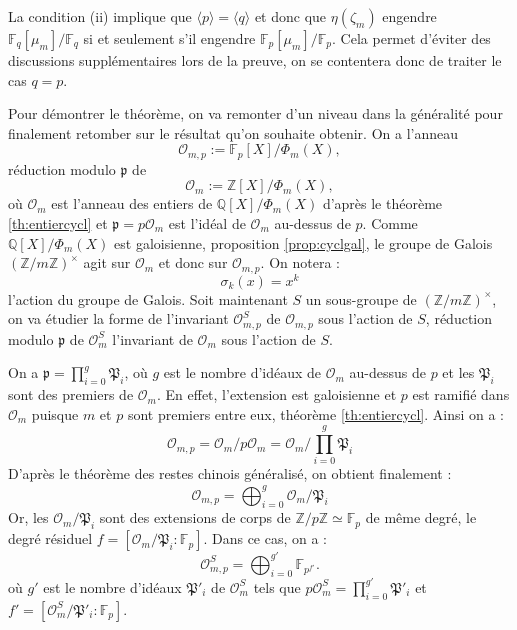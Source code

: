 \documentclass[a4paper]{article} %
\numberwithin{section}{part}
\numberwithin{equation}{section}
\newcommand\zmodninv[1]{(\mathbb{Z}/#1\mathbb{Z})^{\times}}
\newcommand\GF[1]{\mathbb{F}_{#1}}
\newcommand\QQ{\mathbb{Q}}
\newcommand\ZZ{\mathbb{Z}}
\newcommand\EO{\mathcal{O}}
\newcommand\groupgen[1]{\langle{#1}\rangle}
\begin{document}
La condition (ii) implique que $\groupgen{p} = \groupgen{q}$ et donc que
$\eta(\zeta_m)$ engendre $\GF{q}[\mu_m]/\GF{q}$ si et seulement s'il engendre
$\GF{p}[\mu_m]/\GF{p}$. Cela permet d'éviter des discussions supplémentaires 
lors de la preuve, on se contentera donc de traiter le cas $q = p$.\par
Pour démontrer le théorème, on va remonter d'un niveau dans la généralité pour
finalement retomber sur le résultat qu'on souhaite obtenir. On a l'anneau 
\begin{equation}
\EO_{m,p} := \GF{p}[X]/\Phi_m(X),
\end{equation}
réduction modulo $\mathfrak{p}$ de 
\begin{equation}
\EO_m := \ZZ[X]/\Phi_m(X),
\end{equation}
où $\EO_m$ est l'anneau des entiers de $\QQ[X]/\Phi_m(X)$ d'après le théorème 
\ref{th:entiercycl} et $\mathfrak{p} = p\EO_m$ est l'idéal de $\EO_m$ au-dessus 
de $p$. Comme $\QQ[X]/\Phi_m(X)$ est galoisienne, proposition 
\ref{prop:cyclgal}, le groupe de Galois $\zmodninv{m}$ agit sur $\EO_m$ et donc 
sur $\EO_{m,p}$. On notera :
\begin{equation}
\sigma_k(x) = x^k
\end{equation}
l'action du groupe de Galois. Soit maintenant $S$ un sous-groupe de 
$\zmodninv{m}$, on va étudier la forme de l'invariant $\EO_{m,p}^S$  de 
$\EO_{m,p}$ sous l'action de $S$, réduction modulo $\mathfrak{p}$ de $\EO_m^S$ 
l'invariant de $\EO_m$ sous l'action de $S$.\par
On a $\mathfrak{p} = \prod_{i=0}^g{\mathfrak{P}_i}$, où $g$ est le nombre
d'idéaux de $\EO_m$ au-dessus de $p$ et les $\mathfrak{P}_i$ sont des premiers
de $\EO_m$. En effet, l'extension est galoisienne et $p$ est ramifié dans 
$\EO_m$ puisque $m$ et $p$ sont premiers entre eux, théorème 
\ref{th:entiercycl}. Ainsi on a :
\begin{equation}
\EO_{m,p} = \EO_m/p\EO_m = \EO_m/\prod_{i=0}^g{\mathfrak{P}_i}
\end{equation}
D'après le théorème des restes chinois généralisé, on obtient finalement :
\begin{equation}
\EO_{m,p} = \bigoplus_{i=0}^g{\EO_m/\mathfrak{P}_i}
\end{equation}
Or, les $\EO_m/\mathfrak{P}_i$ sont des extensions de corps de $\ZZ/p\ZZ\simeq
\GF{p}$ de même degré, le degré résiduel $f = [\EO_m/\mathfrak{P}_i:\GF{p}]$. 
Dans ce cas, on a :
\begin{equation}
\label{eq:structinvSmodp}
\EO_{m,p}^S = \bigoplus_{i=0}^{g'}{\GF{p^{f'}}}.
\end{equation}
où $g'$ est le nombre d'idéaux $\mathfrak{P}'_i$ de $\EO_m^S$ tels que $p\EO_m^S
= \prod_{i = 0}^{g'}{\mathfrak{P}'_i}$ et $f' = 
[\EO_m^S/\mathfrak{P}'_i:\GF{p}]$.
\end{document}
